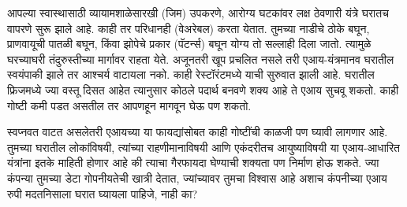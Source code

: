 आपल्या स्वास्थासाठी व्यायामशाळेसारखी (जिम) उपकरणे, आरोग्य घटकांवर लक्ष ठेवणारी यंत्रे घरातच वापरणे सुरू झाले आहे. काही तर परिधानही (वेअरेबल) करता येतात. तुमच्या नाडीचे ठोके बघून, प्राणवायूची पातळी बघून, किंवा झोपेचे प्रकार (पॅटर्न्स) बघून योग्य तो सल्लाही दिला जातो. त्यामुळे घरच्याघरी तंदुरुस्तीच्या मार्गावर राहता येते. अजूनतरी खूप प्रचलित नसले तरी एआय-यंत्रमानव घरातील स्वयंपाकी झाले तर आश्चर्य वाटायला नको. काही रेस्टॉरंटमध्ये याची सुरुवात झाली आहे. घरातील फ्रिजमध्ये ज्या वस्तू दिसत आहेत त्यानुसार कोठले पदार्थ बनवणे शक्य आहे ते एआय सुचवू शकतो. काही गोष्टी कमी पडत असतील तर आपणहून मागवून घेऊ पण शकतो.

स्वप्नवत वाटत असलेतरी एआयच्या या फायद्यांसोबत काही गोष्टींची काळजी पण घ्यावी लागणार आहे. तुमच्या घरातील लोकांविषयी, त्यांच्या राहणीमानाविषयी आणि एकंदरीतच आयुष्याविषयी या एआय-आधारित यंत्रांना इतके माहिती होणार आहे की त्याचा गैरफायदा घेण्याची शक्यता पण निर्माण होऊ शकते. ज्या कंपन्या तुमच्या डेटा गोपनीयतेची खात्री देतात, ज्यांच्यावर तुमचा विश्वास आहे अशाच कंपनीच्या एआय रुपी मदतनिसाला घरात घ्यायला पाहिजे, नाही का?
